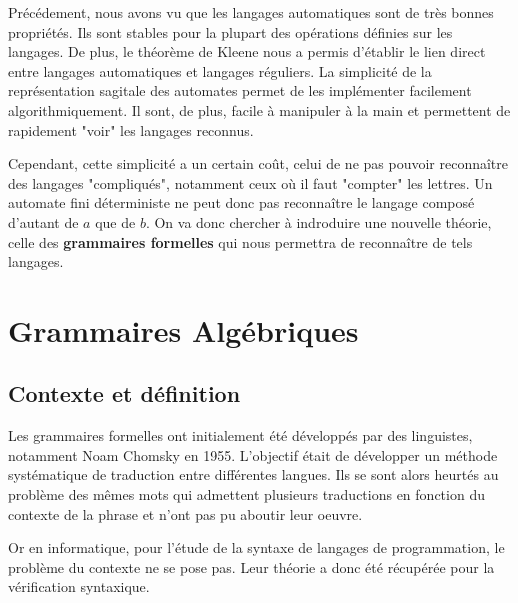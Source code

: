

\minitoc %



Précédement, nous avons vu que les langages automatiques sont de très bonnes propriétés. Ils sont stables 
pour la plupart des opérations définies sur les langages. De plus, le théorème de Kleene nous a permis d'établir 
le lien direct entre langages automatiques et langages réguliers. 
La simplicité de la représentation sagitale des automates permet de les implémenter facilement algorithmiquement. 
Il sont, de plus, facile à manipuler à la main et permettent de rapidement "voir" les langages reconnus. 

Cependant, cette simplicité a un certain coût, celui de ne pas pouvoir reconnaître des langages "compliqués", notamment
ceux où il faut "compter" les lettres. Un automate fini déterministe ne peut donc pas reconnaître le langage composé 
d'autant de $a$ que de $b$. 
On va donc chercher à indroduire une nouvelle théorie, celle des \textbf{grammaires formelles} qui nous permettra
de reconnaître de tels langages. 



\section{Grammaires Algébriques}

\subsection{Contexte et définition}

Les grammaires formelles ont initialement été développés par des linguistes, notamment Noam Chomsky en 1955. 
L'objectif était de développer un méthode systématique de traduction entre différentes langues. 
Ils se sont alors heurtés au problème des mêmes mots qui admettent plusieurs traductions en fonction du contexte de la 
phrase et n'ont pas pu aboutir leur oeuvre. 

\vspace{0.3cm}

Or en informatique, pour l'étude de la syntaxe de langages de programmation, le problème du contexte ne se pose pas. 
Leur théorie a donc été récupérée pour la vérification syntaxique. 

